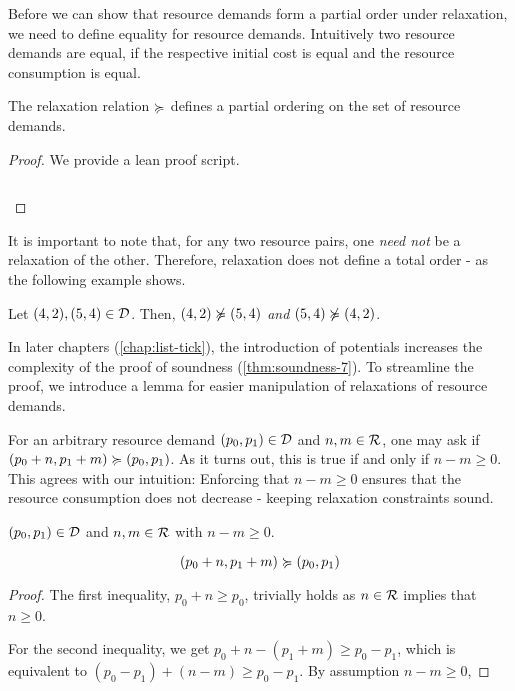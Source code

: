 Before we can show that resource demands form a partial order under relaxation, we need to define equality for resource demands. Intuitively two resource demands are equal, if the respective initial cost is equal and the resource consumption is equal. 

\begin{lemma}
   The relaxation relation \(\succcurlyeq\) defines a partial ordering on the set of resource demands.
\end{lemma}

\begin{proof}
   We provide a lean proof script.
   \inputminted{lean}{formal-proofs/Resources/Relaxation_PO.lean}
\end{proof}

It is important to note that, for any two resource pairs, one \emph{need not} be a relaxation of the other. Therefore, relaxation does not define a total order - as the following example shows.

\begin{example}
   Let \((4,2), (5,4) \in \mathcal{D}\). Then, \((4,2) \notrelaxation (5,4)\) \emph{and} \((5,4) \notrelaxation (4,2)\).
\end{example}

In later chapters (\cref{chap:list-tick}), the introduction of potentials increases the complexity of the proof of soundness (\cref{thm:soundness-7}). To streamline the proof, we introduce a lemma for easier manipulation of relaxations of resource demands.

For an arbitrary resource demand \((p_0, p_1) \in \mathcal{D}\) and \(n, m \in \mathcal{R}\), one may ask if \((p_0 + n, p_1 + m) \succcurlyeq (p_0, p_1)\). As it turns out, this is true if and only if \(n - m \geq 0\). This agrees with our intuition: Enforcing that \(n - m \geq 0\) ensures that the resource consumption does not decrease - keeping relaxation constraints sound.

\begin{lemma}\label{lemma:pos-relaxation}
   \((p_0, p_1) \in \mathcal{D}\) and \(n, m \in \mathcal{R}\) with \(n - m \geq 0\).

   \[
      (p_0 + n, p_1 + m) \succcurlyeq (p_0, p_1)
   \]
\end{lemma}

\begin{proof}
   The first inequality, \(p_0 + n \geq p_0\), trivially holds as \(n \in \mathcal{R}\) implies that \(n \geq 0\). 

   For the second inequality, we get \(p_0 + n - (p_1 + m) \geq p_0 - p_1\), which is equivalent to \((p_0 - p_1) + (n - m) \geq p_0 - p_1\). By assumption \(n - m \geq 0\), 
\end{proof}

